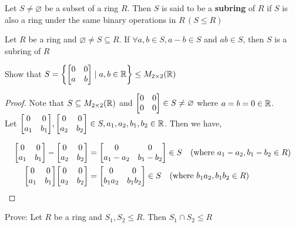 \begin{definition}[Subring]
    Let $S \neq \varnothing$ be a subset of a ring $R$. Then $S$ is said to be a \textbf{subring} of $R$ if $S$ is also a ring under the same binary operations in $R \, (S \leq R)$ 
\end{definition}

\begin{theorem}
    Let $R$ be a ring and $\varnothing \neq S \subseteq R$. If $\forall a, b \in S, a - b \in S$ and $ab \in S$, then $S$ is a subring of $R$
\end{theorem}

\begin{exercise}
    Show that $S = \qty{\mqty[0 & 0 \\ a & b] \mid a, b \in \R} \leq M_{2 \times 2} \qty(\R)$
\end{exercise}

\begin{proof}
    Note that $S \subseteq M_{2 \times 2} (\mathbb{R})$ and $\mqty[0 & 0 \\ 0 & 0] \in S \neq \varnothing$ where $a = b = 0 \in \mathbb{R}$. \\
    
    Let $\mqty[0 & 0 \\ a_1 & b_1], \mqty[0 & 0 \\ a_2 & b_2] \in S, a_1, a_2, b_1, b_2 \in \R$. Then we have,
    
    \begin{align*}
        \mqty[0 & 0 \\ a_1 & b_1] - \mqty[0 & 0 \\ a_2 & b_2] &= \mqty[0 & 0 \\ a_1 - a_2 & b_1 - b_2] \in S \hspace{1em} (\text{where } a_1 - a_2, b_1 - b_2 \in R) \\
         \mqty[0 & 0 \\ a_1 & b_1] \mqty[0 & 0 \\ a_2 & b_2] &= \mqty[0 & 0 \\ b_1a_2 & b_1b_2] \in S \hspace{1em} (\text{where } b_1a_2, b_1b_2 \in R)
    \end{align*}
\end{proof}


\begin{exercise}
    Prove: Let $R$ be a ring and $S_1, S_2 \leq R$. Then $S_1 \cap S_2 \leq R$
\end{exercise}

